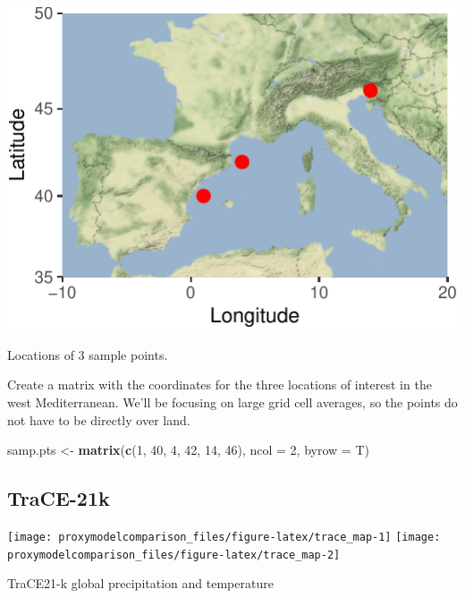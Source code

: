 \documentclass[11pt,]{tufte-handout}
\newenvironment{Shaded}{}{}
\newcommand{\KeywordTok}[1]{\textcolor[rgb]{0.00,0.44,0.13}{\textbf{{#1}}}}
\newcommand{\DataTypeTok}[1]{\textcolor[rgb]{0.56,0.13,0.00}{{#1}}}
\newcommand{\DecValTok}[1]{\textcolor[rgb]{0.25,0.63,0.44}{{#1}}}
\newcommand{\StringTok}[1]{\textcolor[rgb]{0.25,0.44,0.63}{{#1}}}
\newcommand{\NormalTok}[1]{{#1}}
\begin{document}
\begin{marginfigure}
\includegraphics{proxymodelcomparison_files/figure-latex/map-1} \caption[Locations of 3 sample points]{Locations of 3 sample points.}\label{fig:map}
\end{marginfigure}

Create a matrix with the coordinates for the three locations of interest
in the west Mediterranean. We'll be focusing on large grid cell
averages, so the points do not have to be directly over land.

\begin{Shaded}
\begin{Highlighting}[]
\NormalTok{samp.pts <-}\StringTok{ }\KeywordTok{matrix}\NormalTok{(}\KeywordTok{c}\NormalTok{(}\DecValTok{1}\NormalTok{, }\DecValTok{40}\NormalTok{, }\DecValTok{4}\NormalTok{, }\DecValTok{42}\NormalTok{, }\DecValTok{14}\NormalTok{, }\DecValTok{46}\NormalTok{), }
                   \DataTypeTok{ncol =} \DecValTok{2}\NormalTok{, }\DataTypeTok{byrow =} \NormalTok{T)}
\end{Highlighting}
\end{Shaded}

\subsection{TraCE-21k}\label{trace-21k}

\begin{marginfigure}
\texttt{[image: proxymodelcomparison\_files/figure-latex/trace\_map-1]} \texttt{[image: proxymodelcomparison\_files/figure-latex/trace\_map-2]} \caption[TraCE21-k global precipitation and temperature]{TraCE21-k global precipitation and temperature}\label{fig:trace_map}
\end{marginfigure}
\end{document}
